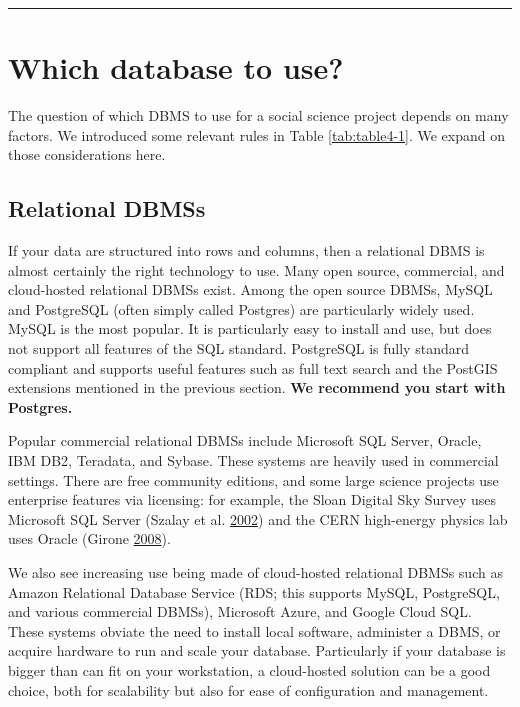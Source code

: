 \documentclass[]{krantz}
\begin{document}
\begin{center}\rule{0.5\linewidth}{\linethickness}\end{center}

\section{Which database to use?}\label{which-database-to-use}

The question of which DBMS to use for a social science project depends
on many factors. We introduced some relevant rules in Table
\ref{tab:table4-1}. We expand on those considerations here.

\subsection{Relational DBMSs}\label{relational-dbmss-1}

If your data are structured into rows and columns, then a relational
DBMS is almost certainly the right technology to use. Many open source,
commercial, and cloud-hosted relational DBMSs exist. Among the open
source DBMSs, MySQL and PostgreSQL (often simply called Postgres) are
particularly widely used. MySQL is the most popular. It is particularly
easy to install and use, but does not support all features of the SQL
standard. PostgreSQL is fully standard compliant and supports useful
features such as full text search and the PostGIS extensions mentioned
in the previous section. \textbf{We recommend you start with Postgres.}

Popular commercial relational DBMSs include Microsoft SQL Server,
Oracle, IBM DB2, Teradata, and Sybase. These systems are heavily used in
commercial settings. There are free community editions, and some large
science projects use enterprise features via licensing: for example, the
Sloan Digital Sky Survey uses Microsoft SQL Server (Szalay et al.
\protect\hyperlink{ref-szalay2002sdss}{2002}) and the CERN high-energy
physics lab uses Oracle (Girone
\protect\hyperlink{ref-girone2008cern}{2008}).

We also see increasing use being made of cloud-hosted relational DBMSs
such as Amazon Relational Database Service (RDS; this supports MySQL,
PostgreSQL, and various commercial DBMSs), Microsoft Azure, and Google
Cloud SQL. These systems obviate the need to install local software,
administer a DBMS, or acquire hardware to run and scale your database.
Particularly if your database is bigger than can fit on your
workstation, a cloud-hosted solution can be a good choice, both for
scalability but also for ease of configuration and management.
\end{document}
